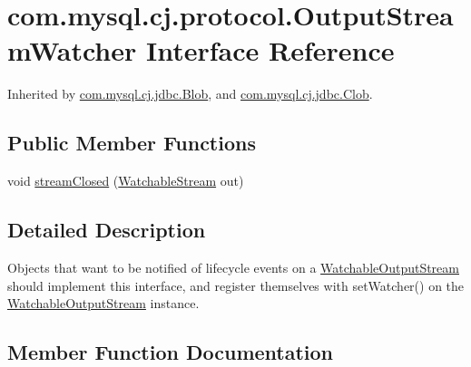\hypertarget{interfacecom_1_1mysql_1_1cj_1_1protocol_1_1_output_stream_watcher}{}\section{com.\+mysql.\+cj.\+protocol.\+Output\+Stream\+Watcher Interface Reference}
\label{interfacecom_1_1mysql_1_1cj_1_1protocol_1_1_output_stream_watcher}


Inherited by \mbox{\hyperlink{classcom_1_1mysql_1_1cj_1_1jdbc_1_1_blob}{com.\+mysql.\+cj.\+jdbc.\+Blob}}, and \mbox{\hyperlink{classcom_1_1mysql_1_1cj_1_1jdbc_1_1_clob}{com.\+mysql.\+cj.\+jdbc.\+Clob}}.

\subsection*{Public Member Functions}
\begin{DoxyCompactItemize}
\item 
void \mbox{\hyperlink{interfacecom_1_1mysql_1_1cj_1_1protocol_1_1_output_stream_watcher_ab830e1917ebb2d14757c5fd1f5dc35ab}{stream\+Closed}} (\mbox{\hyperlink{interfacecom_1_1mysql_1_1cj_1_1protocol_1_1_watchable_stream}{Watchable\+Stream}} out)
\end{DoxyCompactItemize}


\subsection{Detailed Description}
Objects that want to be notified of lifecycle events on a \mbox{\hyperlink{classcom_1_1mysql_1_1cj_1_1protocol_1_1_watchable_output_stream}{Watchable\+Output\+Stream}} should implement this interface, and register themselves with set\+Watcher() on the \mbox{\hyperlink{classcom_1_1mysql_1_1cj_1_1protocol_1_1_watchable_output_stream}{Watchable\+Output\+Stream}} instance. 

\subsection{Member Function Documentation}
\mbox{\label{interfacecom_1_1mysql_1_1cj_1_1protocol_1_1_output_stream_watcher_ab830e1917ebb2d14757c5fd1f5dc35ab}} 
